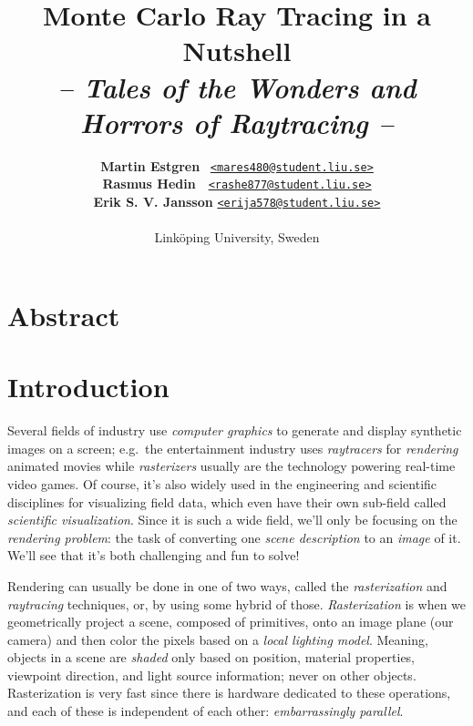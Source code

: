 \documentclass[a4paper, twocolumn]{article}
\title{\textbf{Monte Carlo Ray Tracing in a Nutshell}\\
       \Large{\textit{-- Tales of the Wonders and Horrors of Raytracing --}}}
\author{{\textbf{Martin Estgren}} \;\;\;\;\;\;\,   {\href{mailto:mares480@student.liu.se}
                                                       {\texttt{<mares480@student.liu.se>}}} \\
        {\textbf{Rasmus Hedin}} \;\;\;\;\;\;\;\,\, {\href{mailto:rashe877@student.liu.se}
                                                       {\texttt{<rashe877@student.liu.se>}}} \\
        {\textbf{Erik S. V. Jansson}} \;           {\href{mailto:erija578@student.liu.se}
                                                       {\texttt{<erija578@student.liu.se>}}} \\~\\
        {Linköping University, Sweden}\vspace{-2.0ex}}
\begin{document}
    \maketitle
    \section*{Abstract}

    \newpage \tableofcontents \clearpage

    \section{Introduction} \label{sec:introduction}

        Several fields of industry use \emph{computer graphics} to generate and display synthetic images on a screen; e.g.\ the entertainment industry uses \emph{raytracers} for \emph{rendering} animated movies while \emph{rasterizers} usually are the technology powering real-time video games. Of course, it's also widely used in the engineering and scientific disciplines for visualizing field data, which even have their own sub-field called \emph{scientific visualization}. Since it is such a wide field, we'll only be focusing on the \emph{rendering problem}: the task of converting one \emph{scene description} to an \emph{image} of it. We'll see that it's both challenging and fun to solve!

        Rendering can usually be done in one of two ways, called the \emph{rasterization} and \emph{raytracing} techniques, or, by using some hybrid of those. \emph{Rasterization} is when we geometrically project a scene, composed of primitives, onto an image plane (our camera) and then color the pixels based on a \emph{local lighting model}. Meaning, objects in a scene are \emph{shaded} only based on position, material properties, viewpoint direction, and light source information; never on other objects. Rasterization is very fast since there is hardware dedicated to these operations, and each of these is independent of each other: \emph{embarrassingly parallel}.

    \newpage
\end{document}

